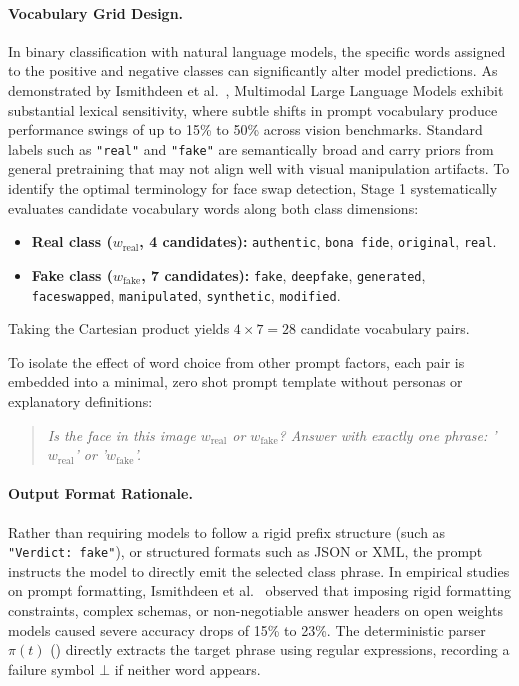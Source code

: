 \paragraph{Vocabulary Grid Design.}
In binary classification with natural language models, the specific words assigned to the positive and negative classes can significantly alter model predictions. As demonstrated by Ismithdeen et al.~\cite{ismithdeen2025promptception}, Multimodal Large Language Models exhibit substantial lexical sensitivity, where subtle shifts in prompt vocabulary produce performance swings of up to \num{15}\% to \num{50}\% across vision benchmarks. Standard labels such as \texttt{"real"} and \texttt{"fake"} are semantically broad and carry priors from general pretraining that may not align well with visual manipulation artifacts. To identify the optimal terminology for face swap detection, Stage 1 systematically evaluates candidate vocabulary words along both class dimensions:
\begin{itemize}
    \item \textbf{Real class ($w_{\text{real}}$, 4 candidates):} \texttt{authentic}, \texttt{bona fide}, \texttt{original}, \texttt{real}.
    \item \textbf{Fake class ($w_{\text{fake}}$, 7 candidates):} \texttt{fake}, \texttt{deepfake}, \texttt{generated}, \\\texttt{{faceswapped}}, \texttt{manipulated}, \texttt{synthetic}, \texttt{modified}.
\end{itemize}
Taking the Cartesian product yields $4 \times 7 = 28$ candidate vocabulary pairs.

To isolate the effect of word choice from other prompt factors, each pair is embedded into a minimal, zero shot prompt template without personas or explanatory definitions:
\begin{quote}
    \emph{Is the face in this image $w_{\text{real}}$ or $w_{\text{fake}}$? Answer with exactly one phrase: '$w_{\text{real}}$' or '$w_{\text{fake}}$'.}
\end{quote}

\paragraph{Output Format Rationale.}
Rather than requiring models to follow a rigid prefix structure (such as \texttt{"Verdict: fake"}), or structured formats such as JSON or XML, the prompt instructs the model to directly emit the selected class phrase. In empirical studies on prompt formatting, Ismithdeen et al.~\cite{ismithdeen2025promptception} observed that imposing rigid formatting constraints, complex schemas, or non-negotiable answer headers on open weights models caused severe accuracy drops of \num{15}\% to \num{23}\%. The deterministic parser $\pi(t)$ () directly extracts the target phrase using regular expressions, recording a failure symbol $\bot$ if neither word appears.

